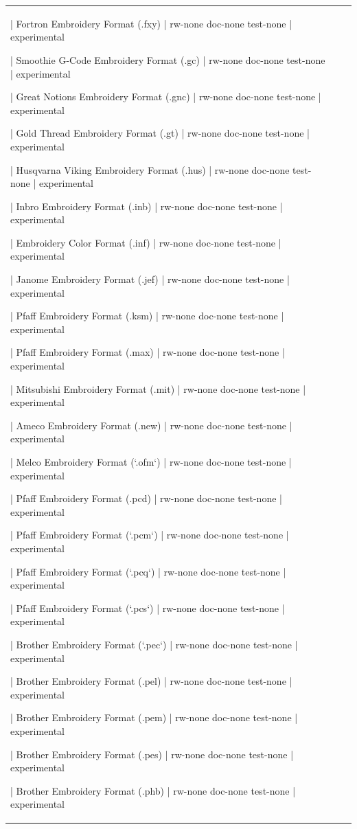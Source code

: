 \begin{tabular}{l l l}
{{| Fortron Embroidery Format (.fxy)
| rw-none doc-none test-none
| experimental

| Smoothie G-Code Embroidery Format (.gc)
| rw-none doc-none test-none
| experimental

| Great Notions Embroidery Format (.gnc)
| rw-none doc-none test-none
| experimental

| Gold Thread Embroidery Format (.gt)
| rw-none doc-none test-none
| experimental

| Husqvarna Viking Embroidery Format (.hus)
| rw-none doc-none test-none
| experimental

| Inbro Embroidery Format (.inb)
| rw-none doc-none test-none
| experimental

| Embroidery Color Format (.inf)
| rw-none doc-none test-none
| experimental

| Janome Embroidery Format (.jef)
| rw-none doc-none test-none
| experimental

| Pfaff Embroidery Format (.ksm)
| rw-none doc-none test-none
| experimental

| Pfaff Embroidery Format (.max)
| rw-none doc-none test-none
| experimental

| Mitsubishi Embroidery Format (.mit)
| rw-none doc-none test-none
| experimental

| Ameco Embroidery Format (.new)
| rw-none doc-none test-none
| experimental

| Melco Embroidery Format (`.ofm`)
| rw-none doc-none test-none
| experimental

| Pfaff Embroidery Format (.pcd)
| rw-none doc-none test-none
| experimental

| Pfaff Embroidery Format (`.pcm`)
| rw-none doc-none test-none
| experimental

| Pfaff Embroidery Format (`.pcq`)
| rw-none doc-none test-none
| experimental

| Pfaff Embroidery Format (`.pcs`)
| rw-none doc-none test-none
| experimental

| Brother Embroidery Format (`.pec`)
| rw-none doc-none test-none
| experimental

| Brother Embroidery Format (.pel)
| rw-none doc-none test-none
| experimental

| Brother Embroidery Format (.pem)
| rw-none doc-none test-none
| experimental

| Brother Embroidery Format (.pes)
| rw-none doc-none test-none
| experimental

| Brother Embroidery Format (.phb)
| rw-none doc-none test-none
| experimental

}}
\end{tabular}
